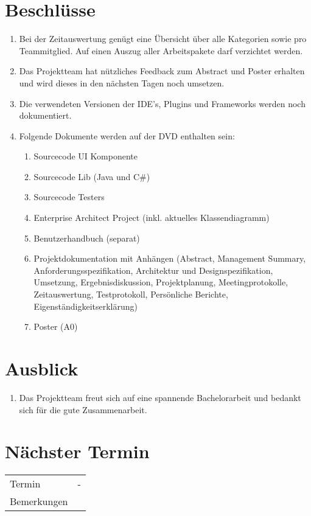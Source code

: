 \documentclass[11pt, a4paper,oneside]{scrartcl}
\begin{document}
	\section{Beschlüsse}
	\begin{enumerate}
		\item Bei der Zeitauswertung genügt eine Übersicht über alle Kategorien sowie pro Teammitglied. Auf einen Auszug aller Arbeitspakete darf verzichtet werden. 
		\item Das Projektteam hat nützliches Feedback zum Abstract und Poster erhalten und wird dieses in den nächsten Tagen noch umsetzen.
		\item Die verwendeten Versionen der IDE's, Plugins und Frameworks werden noch dokumentiert.
		\item Folgende Dokumente werden auf der DVD enthalten sein:
		\begin{enumerate}
			\item Sourcecode UI Komponente
			\item Sourcecode Lib (Java und C\#)
			\item Sourcecode Testers
			\item Enterprise Architect Project (inkl. aktuelles Klassendiagramm)
			\item Benutzerhandbuch (separat)
			\item Projektdokumentation mit Anhängen (Abstract, Management Summary, Anforderungsspezifikation, Architektur und Designspezifikation, Umsetzung, Ergebnisdiskussion, Projektplanung, Meetingprotokolle, Zeitauswertung, Testprotokoll, Persönliche Berichte, Eigenständigkeitserklärung)
			\item Poster (A0)
		\end{enumerate}
	\end{enumerate}
	
	\section{Ausblick}
	\begin{enumerate}
		\item Das Projektteam freut sich auf eine spannende Bachelorarbeit und bedankt sich für die gute Zusammenarbeit.		
	\end{enumerate}
	
	\section{Nächster Termin}
	\begin{tabu} to \linewidth {l X }
		\toprule
		Termin & -  \\
		Bemerkungen &  \\
		\bottomrule
	\end{tabu}
	
\end{document}

